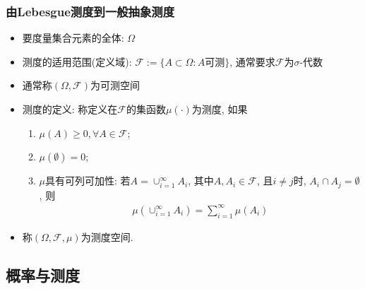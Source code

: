 \documentclass[Prob-All.tex]{subfiles}
\begin{document}
\begin{frame}
	\frametitle{ 由{\rm Lebesgue}测度到一般抽象测度}
	\begin{itemize}[<+-|alert@+>]
		\item 要度量集合元素的全体: $\Omega$
		\item 测度的适用范围(定义域): $\mathcal{F}:=\{A\subset \Omega:A\mbox{可测}\}$, 通常要求$\mathcal{F}$为$\sigma$-代数
		\item 通常称$(\Omega, \mathcal{F})$为可测空间
		\item 测度的定义: 称定义在$\mathcal{F}$的集函数$\mu(\cdot)$为测度, 如果
		\begin{enumerate}[<+-|alert@+>][(1)]
			\item $\mu(A)\ge 0, \forall A\in \mathcal{F}$;
			\item $\mu(\emptyset)=0$;
			\item $\mu$具有可列可加性: 若$A=\cup_{i=1}^{\infty}A_i$, 其中$A, A_i\in \mathcal{F}$,  且$i\neq j$时, $A_i\cap A_j=\emptyset$,  则
			\begin{eqnarray*}
				\mu(\cup_{i=1}^{\infty}A_i)=\sum_{i=1}^{\infty}\mu(A_i)
			\end{eqnarray*}

		\end{enumerate}
		\item  称$(\Omega,\mathcal{F},\mu)$为测度空间.
	\end{itemize}

\end{frame}

\subsection{概率与测度}



\end{document}
